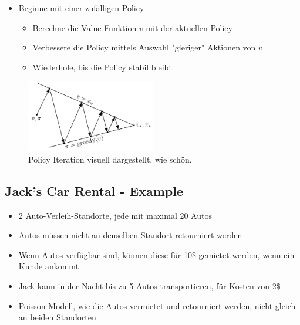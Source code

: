 \documentclass[a4paper]{article}
\begin{document}
		\begin{itemize}
			\item Beginne mit einer zufälligen Policy
				\begin{itemize}
					\item Berechne die Value Funktion $v$ mit der aktuellen Policy
					\item Verbessere die Policy mittels Auswahl "gieriger" Aktionen von $v$
					\item Wiederhole, bis die Policy stabil bleibt
				\end{itemize}
		\end{itemize}
		
		\begin{figure}[htb!]
			\centering
			\includegraphics[width=0.5\textwidth]{img/08_reinforcement_learning/policy_iteration.png}
			\caption{Policy Iteration visuell dargestellt, wie schön.}
		\end{figure}
	
		\newpage
			
		\subsection{Jack's Car Rental - Example}
		
		\begin{itemize}
			\item 2 Auto-Verleih-Standorte, jede mit maximal 20 Autos
			\item Autos müssen nicht an denselben Standort retourniert werden
			\item Wenn Autos verfügbar sind, können diese für 10\$ gemietet werden, wenn ein Kunde ankommt
			\item Jack kann in der Nacht bis zu 5 Autos transportieren, für Kosten von 2\$
			\item Poisson-Modell, wie die Autos vermietet und retourniert werden, nicht gleich an beiden Standorten
		\end{itemize}
	
\end{document}
